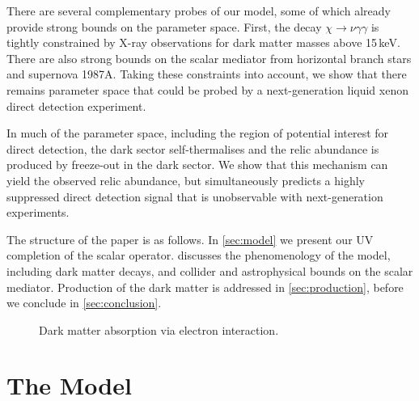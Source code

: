 \documentclass[aps, prd, reprint, nofootinbib, amsmath, amssymb, floatfix]{revtex4-2}
\begin{document}
There are several complementary probes of our model, some of which already provide strong bounds on the parameter space. First, the decay $\chi\to\nu\gamma\gamma$ is tightly constrained by X-ray observations for dark matter masses above 15\,keV. There are also strong bounds on the scalar mediator from horizontal branch stars and supernova 1987A. Taking these constraints into account, we show that there remains parameter space that could be probed by a next-generation liquid xenon direct detection experiment. 

In much of the parameter space, including the region of potential interest for direct detection, the dark sector self-thermalises and the relic abundance is produced by freeze-out in the dark sector. We show that this mechanism can yield the observed relic abundance, but simultaneously predicts a highly suppressed direct detection signal that is unobservable with next-generation experiments. 

The structure of the paper is as follows. In \cref{sec:model} we present our UV completion of the scalar operator.  discusses the phenomenology of the model, including dark matter decays, and collider and astrophysical bounds on the scalar mediator. Production of the dark matter is addressed in \cref{sec:production}, before we conclude in \cref{sec:conclusion}.

\begin{figure}
\caption{Dark matter absorption via electron interaction.}
    \label{fig:absorption-diagram}
\end{figure}



\section{\label{sec:model}The Model}
\end{document}
